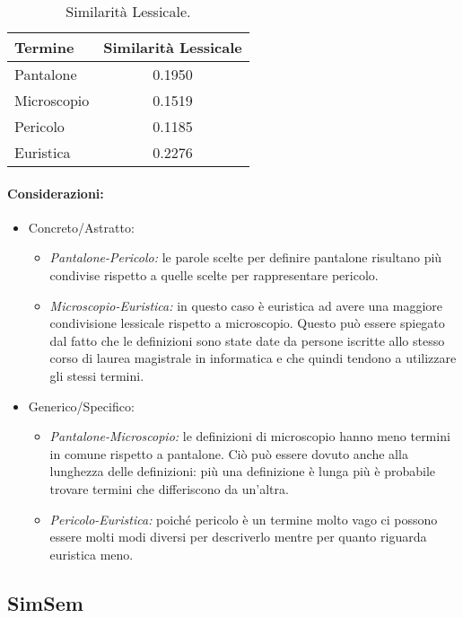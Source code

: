 \begin{table}[ht]
\centering
\caption{Similarità Lessicale.}
\begin{tabular}{|l|c|}
\hline
Termine & Similarità Lessicale \\
\hline
Pantalone & 0.1950 \\ 
\hline
Microscopio & 0.1519 \\ 
\hline
Pericolo & 0.1185\\
\hline
Euristica & 0.2276\\ 
\hline
\end{tabular}
\end{table}

\paragraph{Considerazioni:} 

\begin{itemize}
  \item Concreto/Astratto:
    \begin{itemize}
      \item \textit{Pantalone-Pericolo:} le parole scelte per definire pantalone risultano più condivise rispetto a quelle scelte per rappresentare pericolo.
      \item \textit{Microscopio-Euristica:} in questo caso è euristica ad avere una maggiore condivisione lessicale rispetto a microscopio. Questo può essere spiegato dal fatto che le definizioni sono state date da persone iscritte allo stesso corso di laurea magistrale in informatica e che quindi tendono a utilizzare gli stessi termini.
    \end{itemize}
  \item Generico/Specifico:
    \begin{itemize}
      \item \textit{Pantalone-Microscopio:} le definizioni di microscopio hanno meno termini in comune rispetto a pantalone. Ciò può essere dovuto anche alla lunghezza delle definizioni: più una definizione è lunga più è probabile trovare termini che differiscono da un'altra. 
      \item \textit{Pericolo-Euristica:} poiché pericolo è un termine molto vago ci possono essere molti modi diversi per descriverlo mentre per quanto riguarda euristica meno.
    \end{itemize}
\end{itemize}

\subsection{SimSem}

